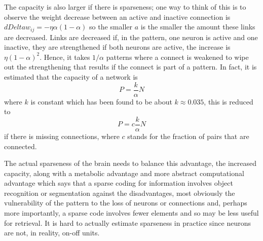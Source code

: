\documentclass[12pt]{article}
\begin{document}
The capacity is also larger if there is sparseness; one way to think
of this is to observe the weight decrease between an active and
inactive connection is $dDelta w_{ij}=-\eta \alpha (1-\alpha)$ so the smaller
$a$ is the smaller the amount these links are decreased. Links are
decreased if, in the pattern, one neuron is active and one inactive,
they are strengthened if both neurons are active, the increase is
$\eta (1-\alpha)^2$. Hence, it takes $1/\alpha$ patterns where a connect is
weakened to wipe out the strengthening that results if the connect is
part of a pattern. In fact, it is estimated that the capacity of a
network is
\begin{equation}
P=\frac{k}{\alpha}N
\end{equation}
where $k$ is constant which has been found to be about $k\approx
0.035$, this is reduced to 
\begin{equation}
P=c\frac{k}{\alpha}N
\end{equation}
if there is missing connections, where $c$ stands for the fraction of pairs that are connected.

The actual sparseness of the brain needs to balance this advantage,
the increased capacity, along with a metabolic advantage and more
abstract computational advantage which says that a sparse coding for
information involves object recognition or segmentation against the
disadvantages, most obviously the vulnerability of the pattern to the
loss of neurons or connections and, perhaps more importantly, a sparse
code involves fewer elements and so may be less useful for
retrieval. It is hard to actually estimate sparseness in practice
since neurons are not, in reality, on-off units.
\end{document}
